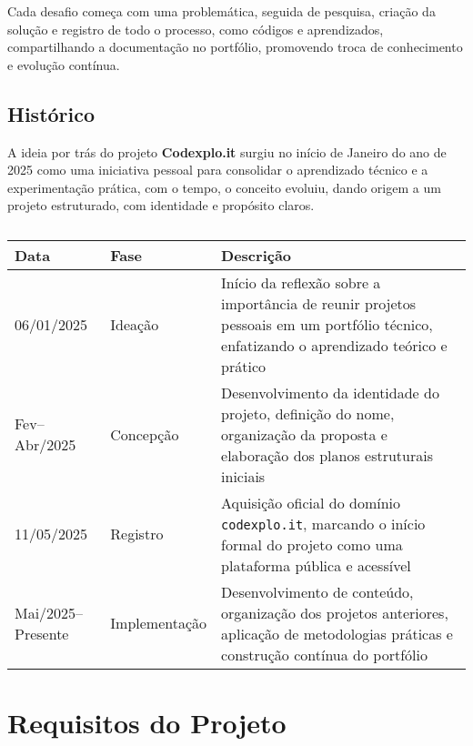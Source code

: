 \documentclass[10pt, a4paper, oneside]{article}
\begin{document}
Cada desafio começa com uma problemática, seguida de pesquisa, criação da solução e registro de todo o processo, como códigos e aprendizados, compartilhando a documentação no portfólio, promovendo troca de conhecimento e evolução contínua.

\subsection{Histórico}

A ideia por trás do projeto \textbf{Codexplo.it} surgiu no início de Janeiro do ano de 2025 como uma iniciativa pessoal para consolidar o aprendizado técnico e a experimentação prática, com o tempo, o conceito evoluiu, dando origem a um projeto estruturado, com identidade e propósito claros.

\begin{table}[ht]
    \centering
    \setlength\tabcolsep{6pt}
    \begin{tabular}{ |l|l|p{6.8cm}| }
        \hline
        \bfseries Data & \bfseries Fase & \bfseries Descrição \\
        \hline
        06/01/2025 & Ideação & Início da reflexão sobre a importância de reunir projetos pessoais em um portfólio técnico, enfatizando o aprendizado teórico e prático \\
        \hline
        Fev–Abr/2025 & Concepção & Desenvolvimento da identidade do projeto, definição do nome, organização da proposta e elaboração dos planos estruturais iniciais \\
        \hline
        11/05/2025 & Registro & Aquisição oficial do domínio \texttt{codexplo.it}, marcando o início formal do projeto como uma plataforma pública e acessível \\
        \hline
        Mai/2025–Presente & Implementação & Desenvolvimento de conteúdo, organização dos projetos anteriores, aplicação de metodologias práticas e construção contínua do portfólio \\
        \hline
    \end{tabular}
    \caption{\fontsize{10pt}{11pt}}
    \label{table:history}
\end{table}
\newpage



\section{Requisitos do Projeto}
\end{document}
